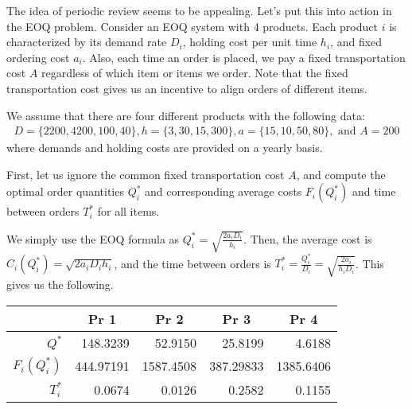 The idea of periodic review seems to be appealing. Let's put this into action in the EOQ problem. Consider an EOQ system with 4 products. Each product $i$ is characterized by its demand rate $D_i$, holding cost per unit time $h_i$, and fixed ordering cost $a_i$. Also, each time an order is placed, we pay a fixed transportation cost $A$ regardless of which item or items we order. Note that the fixed transportation cost gives us an incentive to align orders of different items. 

We assume that there are four different products with the following data: 
\begin{align*}
D=\{2200,4200,100,40\}, h=\{3,30,15,300\}, a=\{15,10,50,80\}, \text{ and } A=200
\end{align*}
where demands and holding costs are provided on a yearly basis.

\begin{exercise}
First, let us ignore the common fixed transportation cost $A$, and compute the optimal order quantities $Q^*_i$ and corresponding average costs $F_i(Q^*_i)$ and time between orders $T^*_i$ for all items.


\begin{solution}
We simply use the EOQ formula as $Q^*_i=\sqrt{\frac{2a_iD_i}{h_i}}$. Then, the average cost is $C_i(Q^*_i)=\sqrt{2a_iD_ih_i}$, and 
the time between orders is $T^*_i=\frac{Q^*_i}{D_i}=\sqrt{\frac{2a_i}{h_i D_i}}$. This gives us the following.

\begin{center}
    \begin{tabular}{r|rrrr}
          			& \multicolumn{1}{c}{Pr 1} & \multicolumn{1}{c}{Pr 2} & \multicolumn{1}{c}{Pr 3} & \multicolumn{1}{c}{Pr 4} \\
    \toprule
    $Q^*$ 			& 148.3239 & 52.9150 & 25.8199 & 4.6188 \\
    $F_i(Q^*_i)$ 	& 444.97191 & 1587.4508 & 387.29833 & 1385.6406 \\
    $T^*_i$ 		& 0.0674 & 0.0126 & 0.2582 & 0.1155 \\
    \bottomrule
    \end{tabular}%
\end{center}
\end{solution}
\end{exercise}

